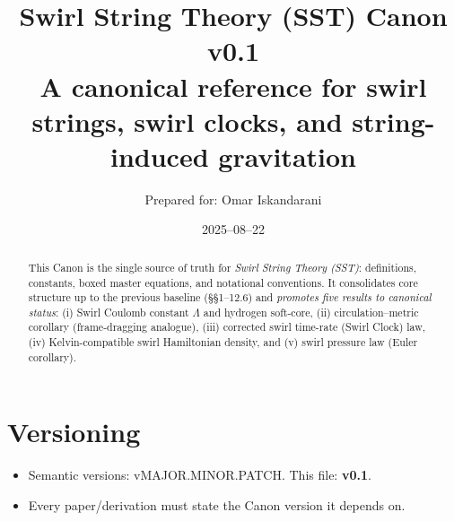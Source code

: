 \documentclass[11pt, a4paper]{article}
\title{\textbf{Swirl String Theory (SST) Canon v0.1}\\
\large A canonical reference for swirl strings, swirl clocks, and string-induced gravitation}
\author{Prepared for: Omar Iskandarani}
\date{2025--08--22}
\newcommand{\Lam}{\Lambda}                               %
\begin{document}
    \maketitle

    \begin{abstract}
        This Canon is the single source of truth for \emph{Swirl String Theory (SST)}: definitions, constants, boxed master equations, and notational conventions. It consolidates core structure up to the previous baseline (\S\S1--12.6) and \emph{promotes five results to canonical status}: (i) Swirl Coulomb constant $\Lam$ and hydrogen soft-core, (ii) circulation--metric corollary (frame-dragging analogue), (iii) corrected swirl time-rate (Swirl Clock) law, (iv) Kelvin-compatible swirl Hamiltonian density, and (v) swirl pressure law (Euler corollary).
    \end{abstract}

    \section{Versioning}
    \begin{itemize}
        \item Semantic versions: vMAJOR.MINOR.PATCH. This file: \textbf{v0.1}.
        \item Every paper/derivation must state the Canon version it depends on.
    \end{itemize}


\end{document}
